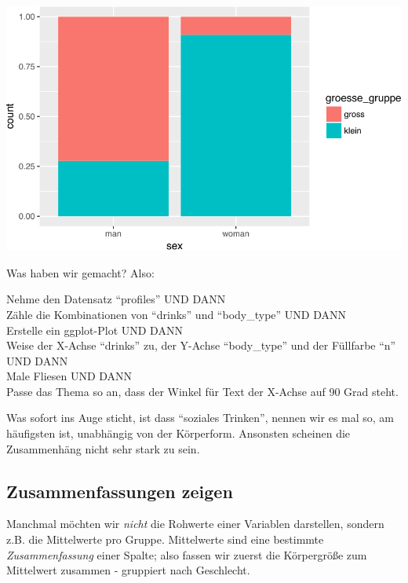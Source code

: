 \documentclass[12pt,ngerman,]{book}
\newenvironment{Shaded}{\begin{snugshade}}{\end{snugshade}}
\newcommand{\KeywordTok}[1]{\textcolor[rgb]{0.13,0.29,0.53}{\textbf{{#1}}}}
\newcommand{\DataTypeTok}[1]{\textcolor[rgb]{0.13,0.29,0.53}{{#1}}}
\newcommand{\StringTok}[1]{\textcolor[rgb]{0.31,0.60,0.02}{{#1}}}
\newcommand{\CommentTok}[1]{\textcolor[rgb]{0.56,0.35,0.01}{\textit{{#1}}}}
\newcommand{\NormalTok}[1]{{#1}}
\renewenvironment{Shaded}{\begin{kframe}}{\end{kframe}}
\let\BeginKnitrBlock\begin \let\EndKnitrBlock\end
\begin{document}
\begin{center}\includegraphics[width=0.7\linewidth]{050_Daten_visualisieren_files/figure-latex/unnamed-chunk-22-1} \end{center}

Was haben wir gemacht? Also:

\BeginKnitrBlock{rmdpseudocode}
Nehme den Datensatz ``profiles'' UND DANN\\
Zähle die Kombinationen von ``drinks'' und ``body\_type'' UND DANN\\
Erstelle ein ggplot-Plot UND DANN\\
Weise der X-Achse ``drinks'' zu, der Y-Achse ``body\_type'' und der
Füllfarbe ``n'' UND DANN\\
Male Fliesen UND DANN\\
Passe das Thema so an, dass der Winkel für Text der X-Achse auf 90 Grad
steht.
\EndKnitrBlock{rmdpseudocode}

Was sofort ins Auge sticht, ist dass ``soziales Trinken'', nennen wir es
mal so, am häufigsten ist, unabhängig von der Körperform. Ansonsten
scheinen die Zusammenhäng nicht sehr stark zu sein.

\subsection{Zusammenfassungen zeigen}\label{zusammenfassungen-zeigen}

Manchmal möchten wir \emph{nicht} die Rohwerte einer Variablen
darstellen, sondern z.B. die Mittelwerte pro Gruppe. Mittelwerte sind
eine bestimmte \emph{Zusammenfassung} einer Spalte; also fassen wir
zuerst die Körpergröße zum Mittelwert zusammen - gruppiert nach
Geschlecht.

\begin{Shaded}
\end{Shaded}
\end{document}
